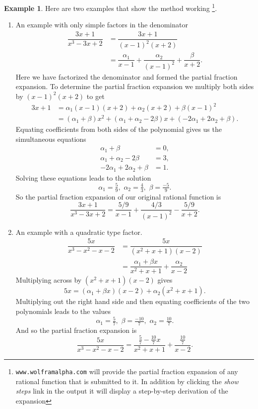 \documentclass[extrafontsizes, twoside, a4paper]{memoir}
\theoremstyle{plain}%
\theoremstyle{definition}
\newtheorem{exmp}{Example}[chapter]
\theoremstyle{remark}
\begin{document}
\begin{exmp}
Here are two examples that show the method working \footnote{\texttt{www.wolframalpha.com} will provide the partial fraction expansion of any rational function that is submitted to it. In addition by clicking the \textit{show steps} link in the output it will display a step-by-step derivation of the expansion}.

\begin{enumerate}
\item
An example with only simple factors in the denominator
\begin{align*}
\dfrac{3x + 1}{x^3 - 3x + 2} &= \dfrac{3x+1}{(x-1)^2(x+2)} \\
&= \dfrac{\alpha_1}{x-1} + \dfrac{\alpha_2}{(x-1)^2} +
\dfrac{\beta}{x+2}. \end{align*} Here we have factorized the
denominator and formed the partial fraction expansion. To determine
the partial fraction expansion we multiply both sides by
$(x-1)^2(x+2)$ to get
\begin{align*} 3x + 1 &= \alpha_1 (x-1)(x+2) + \alpha_2(x+2) + \beta
(x-1)^2 \\
&= (\alpha_1 + \beta )x^2 + (\alpha_1 + \alpha_2 - 2\beta)x + (-2
\alpha_1 +2 \alpha_2 + \beta).
\end{align*}
Equating coefficients from both sides of the polynomial gives us the
simultaneous equations
\begin{align*}
\alpha_1 + \beta &=0, \\
\alpha_1 + \alpha_2 - 2\beta &= 3, \\
-2 \alpha_1 +2 \alpha_2 + \beta &= 1.
\end{align*}
Solving these equations leads to the solution
$$ \alpha_1 = \tfrac{5}{9} , \, \, \alpha_2 = \tfrac{4}{3} , \, \,
\beta=\tfrac{-5}{9} .$$ So the partial fraction expansion of our
original rational function is
$$\dfrac{3x + 1}{x^3 - 3x + 2} =\dfrac{5/9}{x-1} + \dfrac{4/3}{(x-1)^2}
- \dfrac{5/9}{x+2}.$$
\item
An example with a quadratic type factor.
\begin{align*}
\dfrac{5x}{x^3 - x^2 - x - 2} &= \dfrac{5x}{(x^2 + x + 1)(x-2)} \\
&= \dfrac{\alpha_1 + \beta x}{x^2 + x + 1} + \dfrac{\alpha_2}{x-2}
\end{align*}
Multiplying across by $(x^2 + x + 1)(x-2)$ gives
$$ 5x = (\alpha_1 + \beta x)(x-2) + \alpha_2 (x^2 + x + 1).$$
Multiplying out the right hand side and then equating coefficients
of the two polynomials leads to the values
$$\alpha_1 = \tfrac{5}{7} , \, \, \beta=\tfrac{-10}{7} , \, \, \alpha_2 =
\tfrac{10}{7}.$$ And so the partial fraction expansion is
$$\dfrac{5x}{x^3 - x^2 - x - 2} =\dfrac{\tfrac{5}{7} - \tfrac{10}{7} x}{x^2 + x + 1} +
\dfrac{\tfrac{10}{7}}{x-2}.$$
\end{enumerate}
\end{exmp}
\end{document}
